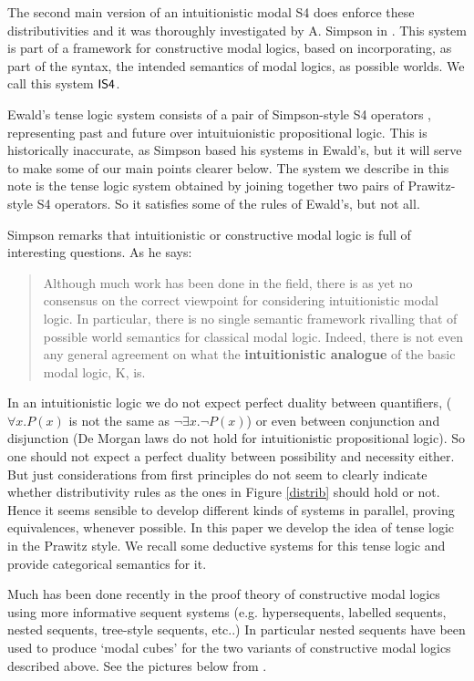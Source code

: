 \documentclass{article}
\begin{document}
The second main version of an intuitionistic modal S4 does enforce these distributivities and it was thoroughly investigated by A. Simpson in \cite{simpson1994}. This system is part of a framework for constructive modal logics, based on incorporating, as part of the syntax, the intended semantics of modal logics, as possible worlds. We call this system $\sf IS4$. 

Ewald's tense logic system consists of a pair of Simpson-style S4 operators \cite{simpson1994},
representing past and future over intuituionistic propositional logic. This is historically inaccurate, as Simpson based his systems in Ewald's, but it will serve to make some of our main points clearer below. The system we describe in this note is the tense logic system obtained by joining together two pairs of Prawitz-style S4 operators. So it satisfies some of the rules of Ewald's, but not all.

Simpson remarks that intuitionistic or constructive modal logic is full of interesting questions. As he says:
\begin{quote}
Although much work has been done in the field, there is as yet no consensus on the correct viewpoint for considering intuitionistic modal logic.  In particular, there is no single semantic framework rivalling that of possible world semantics for classical modal logic. Indeed, there is not even any general agreement on what the \textbf{intuitionistic analogue} of the basic modal logic, K, is.
\end{quote}
In an intuitionistic logic we do not expect perfect duality between quantifiers, ($\forall x.P(x)$ is not the same as $\neg \exists x.\neg
P(x)$) or even between conjunction and disjunction (De Morgan laws do not hold for intuitionistic propositional logic). So one should not expect a perfect duality between possibility and necessity either. But just considerations from first principles do not seem to clearly indicate whether distributivity rules as the ones in Figure \ref{distrib} should hold or not. Hence it seems sensible to develop different kinds of systems in parallel, proving equivalences, whenever possible. In this paper we develop the idea of tense logic in the Prawitz style. We recall some deductive systems for this tense logic and provide categorical semantics for it.


Much has been done recently in the proof theory of constructive modal logics using more informative sequent systems (e.g. hypersequents, labelled sequents, nested sequents, tree-style sequents, etc..) In particular nested sequents have been used to produce `modal cubes' for the two variants of constructive modal logics described above. See the pictures below from \cite{arisaka2015,strasburger2013}.
\end{document}
